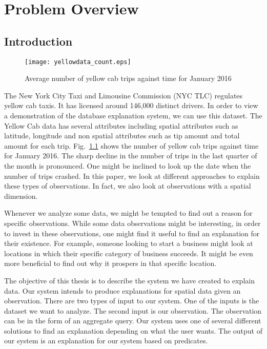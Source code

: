 \chapter{Problem Overview}
\label{sec:Intro}
\section{Introduction}
\begin{figure}[ht]
\texttt{[image: yellowdata\_count.eps]}
\caption{Average number of yellow cab trips against time for January 2016}
\label{fig:yellowstats}
\end{figure}
The New York City Taxi and Limousine Commission (NYC TLC) regulates yellow cab taxis\citep{taxi2016tlc}. It has licensed around 146,000 distinct drivers. In order to view a demonstration of the database explanation system, we can use this dataset. The Yellow Cab data has several attributes including spatial attributes such as latitude, longitude and non spatial attributes such as tip amount and total amount for each trip. Fig.~\ref{fig:yellowstats} shows the number of yellow cab trips against time for January 2016. The sharp decline in the number of trips in the last quarter of the month is pronounced. One might be inclined to look up the date when the number of trips crashed. In this paper, we look at different approaches to explain these types of observations. In fact, we also look at observations with a spatial dimension. 

Whenever we analyze some data, we might be tempted to find out a reason for specific observations. While some data observations might be interesting, in order to invest in these observations, one might find it useful to find an explanation for their existence. For example, someone looking to start a business might look at locations in which their specific category of business succeeds. It might be even more beneficial to find out why it prospers in that specific location.

The objective of this thesis is to describe the system we have created to explain data. Our system intends to produce explanations for spatial data given an observation. There are two types of input to our system. One of the inputs is the dataset we want to analyze. The second input is our observation. The observation can be in the form of an aggregate query. Our system uses one of several different solutions to find an explanation depending on what the user wants. The output of our system is an explanation for our system based on predicates. 


